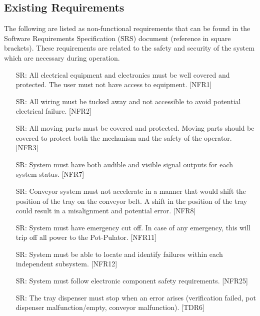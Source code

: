 \documentclass{article}
\newcounter{srreqnum} %
\begin{document}
\subsection{Existing Requirements}
The following are listed as non-functional requirements that can be found in 
the Software Requirements Specification (SRS) document (reference in square brackets).
These requirements are related to the safety and security of the system which are necessary during operation.
\\
\begin{itemize}
    \item[SR\refstepcounter{srreqnum}\thesrreqnum \label{SR1}:]
    All electrical equipment and electronics must be well covered and protected. The user must not have access to equipment. [NFR1]
    \item[SR\refstepcounter{srreqnum}\thesrreqnum \label{SR2}:]
    All wiring must be tucked away and not accessible to avoid potential electrical failure. [NFR2]
    \item[SR\refstepcounter{srreqnum}\thesrreqnum \label{SR3}:]
    All moving parts must be covered and protected. Moving parts should be covered to protect both the mechanism and the safety of the operator. [NFR3]
    \item[SR\refstepcounter{srreqnum}\thesrreqnum \label{SR4}:]
    System must have both audible and visible signal outputs for each system status. [NFR7]
    \item[SR\refstepcounter{srreqnum}\thesrreqnum \label{SR5}:]
    Conveyor system must not accelerate in a manner that would shift the position of 
    the tray on the conveyor belt. A shift in the position of the tray could result in a misalignment and potential error. [NFR8]
    \item[SR\refstepcounter{srreqnum}\thesrreqnum \label{SR6}:]
    System must have emergency cut off. In case of any emergency, this will trip off all power to the Pot-Pulator. [NFR11]
    \item[SR\refstepcounter{srreqnum}\thesrreqnum \label{SR7}:]
    System must be able to locate and identify failures within each independent subsystem. [NFR12]
    \item[SR\refstepcounter{srreqnum}\thesrreqnum \label{SR8}:]
    System must follow electronic component safety requirements. [NFR25]
    \item[SR\refstepcounter{srreqnum}\thesrreqnum \label{SR9}:]
    The tray dispenser must stop when an error arises (verification failed, pot dispenser malfunction/empty, conveyor malfunction). [TDR6]

\end{itemize}
\end{document}
